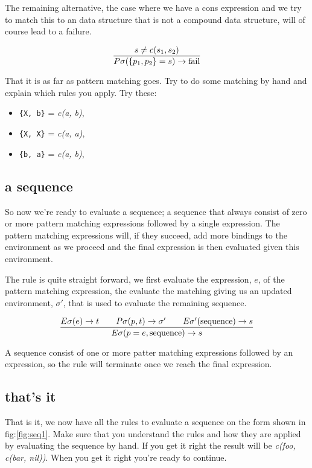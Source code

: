 \documentclass[a4paper,11pt]{article}
\begin{document}
The remaining alternative, the case where we have a cons expression and
we try to match this to an data structure that is not a compound data
structure, will of course lead to a failure.

$$\frac{s \not = c(s_1, s_2)}{P\sigma(\lbrace p_1, p_2 \rbrace = s) \rightarrow {\rm fail}}$$

That it is as far as pattern matching goes. Try to do some matching by
hand and explain which rules you apply. Try these:

\begin{itemize}
\item {\tt \{X, b\}} = {\em c(a, b)}, 
\item {\tt \{X, X\}} = {\em c(a, a)}, 
\item {\tt \{b, a\}} = {\em c(a, b)}, 
\end{itemize}


\subsection{a sequence}

So now we're ready to evaluate a sequence; a sequence that always
consist of zero or more pattern matching expressions followed by a
single expression. The pattern matching expressions will, if they
succeed, add more bindings to the environment as we proceed and the
final expression is then evaluated given this environment.

The rule is quite straight forward, we first evaluate the expression,
$e$, of the pattern matching expression, the evaluate the matching
giving us an updated environment, $\sigma'$, that is used to evaluate
the remaining sequence.

$$\frac{   
E\sigma(e) \rightarrow t
\qquad P\sigma(p, t) \rightarrow \sigma'
\qquad E\sigma'({\rm sequence}) \rightarrow s
}{E\sigma(p = e, {\rm sequence}) \rightarrow s}$$ 

A sequence consist of one or more patter matching expressions
followed by an expression, so the rule will terminate once we reach
the final expression.

\subsection{that's it}

That is it, we now have all the rules to evaluate a sequence on the
form shown in fig:\ref{fig:seq1}. Make sure that you understand
the rules and how they are applied by evaluating the sequence by
hand. If you get it right the result will be {\em c(foo, c(bar,
  nil))}. When you get it right you're ready to continue.
\end{document}
